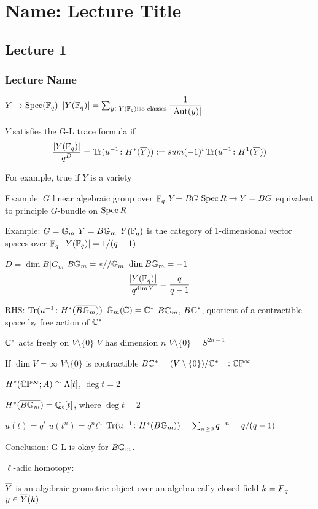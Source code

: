 \newpage
\section{Name: Lecture Title}
\subsection{Lecture 1}
\subsubsection{Lecture Name}


$Y \to \operatorname{Spec}(\mathbb{F}_q)$
$|Y(\mathbb{F}_q)|= \sum_{y \in Y(\mathbb{F}_q) \text{iso classes}} \dfrac{1}{|\operatorname{Aut}(y)|}$

\begin{dfn}
$Y$ satisfies the G-L trace formula if
	\[
	\dfrac{|Y(\mathbb{F}_q)|}{q^D}= \operatorname{Tr}(u^{-1} \colon H^*(\overline{Y})):=sum (-1)^i \operatorname{Tr}(u^{-1} \colon H^1(\overline{Y}))
	\]
\end{dfn}

For example, true if $Y$ is a variety


Example: $G$ linear algebraic group over $\mathbb{F}_q$
$Y= BG$
$\operatorname{Spec} R \to Y= BG$ equivalent to principle $G$-bundle on $\operatorname{Spec} R$



Example: $G= \mathbb{G}_m$
$Y= B\mathbb{G}_m$
$Y(\mathbb{F}_q)$ is the category of 1-dimensional vector spaces over $\mathbb{F}_q$
$|Y(\mathbb{F}_q)|= 1/(q-1)$

$D= \dim B|G_m$
$B\mathbb{G}_m= *//\mathbb{G}_m$
$\dim B\mathbb{G}_m= -1$
	\[
	\dfrac{|Y(\mathbb{F}_q)|}{q^{\dim Y}}= \dfrac{q}{q-1}
	\]

RHS: $\operatorname{Tr}(u^{-1} \colon H^*(\overline{B\mathbb{G}_m}))$
$\mathbb{G}_m(\mathbb{C})=\mathbb{C}^*$
$B\mathbb{G}_m$, $B\mathbb{C}^*$, quotient of a contractible space by free action of $\mathbb{C}^*$

$\mathbb{C}^*$ acts freely on $V \setminus \{0\}$
$V$ has dimension $n$
$V \setminus \{0\}= S^{2n-1}$

If $\dim V= \infty$
$V \setminus \{0\}$ is contractible
$B\mathbb{C}^*= (V \setminus \{0\})/\mathbb{C}^* =: \mathbb{C}\mathbb{P}^\infty$

$H^*(\mathbb{C}\mathbb{P}^\infty; A) \cong \Lambda[t]$, $\deg t= 2$

$H^*(\overline{B\mathbb{G}_m})= \mathbb{Q}_\ell[t]$, where $\deg t= 2$

$u(t)= q^t$
$u(t^n)= q^nt^n$
$\operatorname{Tr}(u^{-1} \colon H^*(B\mathbb{G}_m))= \sum_{n \geq 0} q^{-n}= q/(q-1)$

Conclusion: G-L is okay for $B\mathbb{G}_m$.


$\ell$-adic homotopy:

$\overline{Y}$ is an algebraic-geometric object over an algebraically closed field $k= \overline{F}_q$
$y \in \overline{Y}(k)$ 

